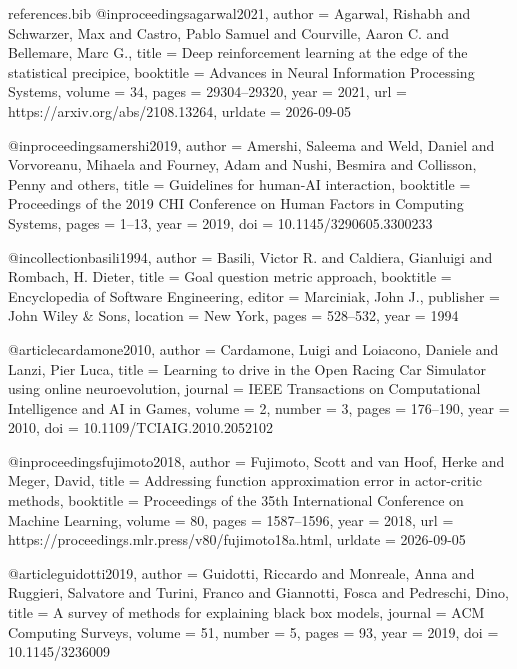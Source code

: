 \begin{filecontents*}{references.bib}
@inproceedings{agarwal2021,
  author    = {Agarwal, Rishabh and Schwarzer, Max and Castro, Pablo Samuel and Courville, Aaron C. and Bellemare, Marc G.},
  title     = {Deep reinforcement learning at the edge of the statistical precipice},
  booktitle = {Advances in Neural Information Processing Systems},
  volume    = {34},
  pages     = {29304--29320},
  year      = {2021},
  url       = {https://arxiv.org/abs/2108.13264},
  urldate   = {2026-09-05}
}

@inproceedings{amershi2019,
  author    = {Amershi, Saleema and Weld, Daniel and Vorvoreanu, Mihaela and Fourney, Adam and Nushi, Besmira and Collisson, Penny and others},
  title     = {Guidelines for human-{AI} interaction},
  booktitle = {Proceedings of the 2019 CHI Conference on Human Factors in Computing Systems},
  pages     = {1--13},
  year      = {2019},
  doi       = {10.1145/3290605.3300233}
}

@incollection{basili1994,
  author    = {Basili, Victor R. and Caldiera, Gianluigi and Rombach, H. Dieter},
  title     = {Goal question metric approach},
  booktitle = {Encyclopedia of Software Engineering},
  editor    = {Marciniak, John J.},
  publisher = {John Wiley \& Sons},
  location  = {New York},
  pages     = {528--532},
  year      = {1994}
}

@article{cardamone2010,
  author  = {Cardamone, Luigi and Loiacono, Daniele and Lanzi, Pier Luca},
  title   = {Learning to drive in the {Open Racing Car Simulator} using online neuroevolution},
  journal = {IEEE Transactions on Computational Intelligence and AI in Games},
  volume  = {2},
  number  = {3},
  pages   = {176--190},
  year    = {2010},
  doi     = {10.1109/TCIAIG.2010.2052102}
}

@inproceedings{fujimoto2018,
  author    = {Fujimoto, Scott and van Hoof, Herke and Meger, David},
  title     = {Addressing function approximation error in actor-critic methods},
  booktitle = {Proceedings of the 35th International Conference on Machine Learning},
  volume    = {80},
  pages     = {1587--1596},
  year      = {2018},
  url       = {https://proceedings.mlr.press/v80/fujimoto18a.html},
  urldate   = {2026-09-05}
}

@article{guidotti2019,
  author  = {Guidotti, Riccardo and Monreale, Anna and Ruggieri, Salvatore and Turini, Franco and Giannotti, Fosca and Pedreschi, Dino},
  title   = {A survey of methods for explaining black box models},
  journal = {ACM Computing Surveys},
  volume  = {51},
  number  = {5},
  pages   = {93},
  year    = {2019},
  doi     = {10.1145/3236009}
}


\end{filecontents*}
